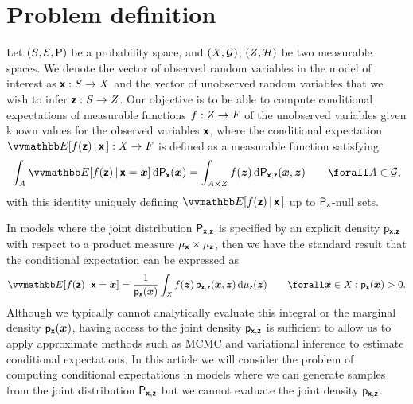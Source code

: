 \section{Problem definition}\label{sec:problem-definition}

Let $(\mathit{S}, \mathcal{E}, \mathsf{P})$ be a probability space, and $(\mathit{X}, \mathcal{G})$, $(\mathit{Z}, \mathcal{H})$ be two measurable spaces. We denote the vector of observed random variables in the model of interest as $\boldsymbol{\mathsf{x}} : \mathit{S} \to \mathit{X}$ and the vector of unobserved random variables that we wish to infer $\boldsymbol{\mathsf{z}} : \mathit{S} \to \mathit{Z}$. Our objective is to be able to compute conditional expectations of measurable functions $f : \mathit{Z} \to \mathit{F}$ of the unobserved variables given known values for the observed variables $\boldsymbol{\mathsf{x}}$, where the conditional expectation $\expc{f(\rvct{z}) \gvn \rvct{x}\,} : \set{X} \to \set{F}$ is defined as a measurable function satisfying
\begin{equation}\label{eq:conditional-expectation-definition}
  \int_{\set{A}}
    \expc{f(\rvct{z}) \gvn \rvct{x} = \vct{x}} 
  \,\dr\prob{\rvct{x}}(\vct{x}) =
  \int_{\set{A} \times \set{Z}}
    f(\vct{z}) 
  \,\dr\prob{\rvct{x},\rvct{z}}(\vct{x},\vct{z})
  \qquad\forall\set{A} \in \sset{G},
\end{equation}
with this identity uniquely defining $\expc{f(\rvct{z}) \gvn \rvct{x}\,}$ up to $\mathsf{P}_{\mathsf{x}}$-null sets.

In models where the joint distribution $\mathsf{P}_{\boldsymbol{\mathsf{x}},\boldsymbol{\mathsf{z}}}$ is specified by an explicit density $\mathsf{p}_{\boldsymbol{\mathsf{x}},\boldsymbol{\mathsf{z}}}$ with respect to a product measure $\mu_{\boldsymbol{\mathsf{x}}} \times \mu_{\boldsymbol{\mathsf{z}}}$, then we have the standard result that the conditional expectation can be expressed as
\begin{equation}
  \expc{f(\rvct{z}) \gvn \rvct{x} = \vct{x}} =
  \frac{1}{\pden{\rvct{x}}(\vct{x})} 
  \int_{\set{Z}} f(\vct{z}) \,\pden{\rvct{x},\rvct{z}}(\vct{x},\vct{z}) 
  \,\dr\mu_{\rvct{z}}(\vct{z})
  \qquad \forall \vct{x} \in \set{X} : \pden{\rvct{x}}(\vct{x}) > 0.
\end{equation}
Although we typically cannot analytically evaluate this integral or the marginal density $\mathsf{p}_{\boldsymbol{\mathsf{x}}}(\boldsymbol{x})$, having access to the joint density $\mathsf{p}_{\boldsymbol{\mathsf{x}},\boldsymbol{\mathsf{z}}}$ is sufficient to allow us to apply approximate methods such as \ac{MCMC} and variational inference to estimate  conditional expectations. In this article we will consider the problem of computing conditional expectations in models where we can generate samples from the joint distribution $\mathsf{P}_{\boldsymbol{\mathsf{x}},\boldsymbol{\mathsf{z}}}$ but we cannot evaluate the joint density $\mathsf{p}_{\boldsymbol{\mathsf{x}},\boldsymbol{\mathsf{z}}}$.%

